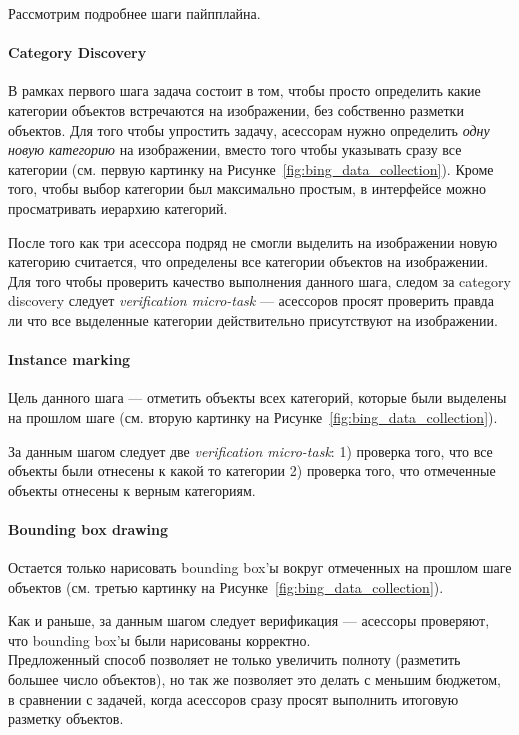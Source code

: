 Рассмотрим подробнее шаги пайпплайна.

\paragraph{Category Discovery} В рамках первого шага задача состоит в том, чтобы просто определить какие категории объектов встречаются на изображении, без собственно разметки объектов.
Для того чтобы упростить задачу, асессорам нужно определить \textit{одну новую категорию} на изображении, вместо того чтобы указывать сразу все категории (см. первую картинку на Рисунке~\ref{fig:bing_data_collection}).
Кроме того, чтобы выбор категории был максимально простым, в интерфейсе можно просматривать иерархию категорий.

После того как три асессора подряд не смогли выделить на изображении новую категорию считается, что определены все категории объектов на изображении. \\

Для того чтобы проверить качество выполнения данного шага, следом за category discovery следует \textit{verification micro-task} --- асессоров просят проверить правда ли что все выделенные категории действительно присутствуют на изображении.

\paragraph{Instance marking} Цель данного шага --- отметить объекты всех категорий, которые были выделены на прошлом шаге (см. вторую картинку на Рисунке~\ref{fig:bing_data_collection}). 

За данным шагом следует две \textit{verification micro-task}: 1) проверка того, что все объекты были отнесены к какой то категории 2) проверка того, что отмеченные объекты отнесены к верным категориям.

\paragraph{Bounding box drawing} Остается только нарисовать bounding box'ы вокруг отмеченных на прошлом шаге объектов (см. третью картинку на Рисунке~\ref{fig:bing_data_collection}).

Как и раньше, за данным шагом следует верификация --- асессоры проверяют, что bounding box'ы были нарисованы корректно. \\

Предложенный способ позволяет не только увеличить полноту (разметить большее число объектов), но так же позволяет это делать с меньшим бюджетом, в сравнении с задачей, когда асессоров сразу просят выполнить итоговую разметку объектов. \\

